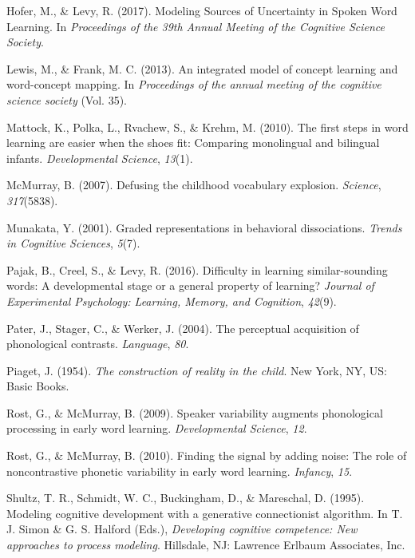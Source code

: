 \documentclass[english,,man]{apa6}
\begin{document}
\leavevmode\hypertarget{ref-hofer2017}{}%
Hofer, M., \& Levy, R. (2017). Modeling Sources of Uncertainty in Spoken Word Learning. In \emph{Proceedings of the 39th Annual Meeting of the Cognitive Science Society}.

\leavevmode\hypertarget{ref-lewis2013}{}%
Lewis, M., \& Frank, M. C. (2013). An integrated model of concept learning and word-concept mapping. In \emph{Proceedings of the annual meeting of the cognitive science society} (Vol. 35).

\leavevmode\hypertarget{ref-Mattock2010}{}%
Mattock, K., Polka, L., Rvachew, S., \& Krehm, M. (2010). The first steps in word learning are easier when the shoes fit: Comparing monolingual and bilingual infants. \emph{Developmental Science}, \emph{13}(1).

\leavevmode\hypertarget{ref-McMurray2007}{}%
McMurray, B. (2007). Defusing the childhood vocabulary explosion. \emph{Science}, \emph{317}(5838).

\leavevmode\hypertarget{ref-Munakata2001}{}%
Munakata, Y. (2001). Graded representations in behavioral dissociations. \emph{Trends in Cognitive Sciences}, \emph{5}(7).

\leavevmode\hypertarget{ref-pajak2016}{}%
Pajak, B., Creel, S., \& Levy, R. (2016). Difficulty in learning similar-sounding words: A developmental stage or a general property of learning? \emph{Journal of Experimental Psychology: Learning, Memory, and Cognition}, \emph{42}(9).

\leavevmode\hypertarget{ref-pater2004}{}%
Pater, J., Stager, C., \& Werker, J. (2004). The perceptual acquisition of phonological contrasts. \emph{Language}, \emph{80}.

\leavevmode\hypertarget{ref-piaget1954}{}%
Piaget, J. (1954). \emph{The construction of reality in the child}. New York, NY, US: Basic Books.

\leavevmode\hypertarget{ref-rost2009}{}%
Rost, G., \& McMurray, B. (2009). Speaker variability augments phonological processing in early word learning. \emph{Developmental Science}, \emph{12}.

\leavevmode\hypertarget{ref-rost2010}{}%
Rost, G., \& McMurray, B. (2010). Finding the signal by adding noise: The role of noncontrastive phonetic variability in early word learning. \emph{Infancy}, \emph{15}.

\leavevmode\hypertarget{ref-shultz1995}{}%
Shultz, T. R., Schmidt, W. C., Buckingham, D., \& Mareschal, D. (1995). Modeling cognitive development with a generative connectionist algorithm. In T. J. Simon \& G. S. Halford (Eds.), \emph{Developing cognitive competence: New approaches to process modeling}. Hillsdale, NJ: Lawrence Erlbaum Associates, Inc.
\end{document}
